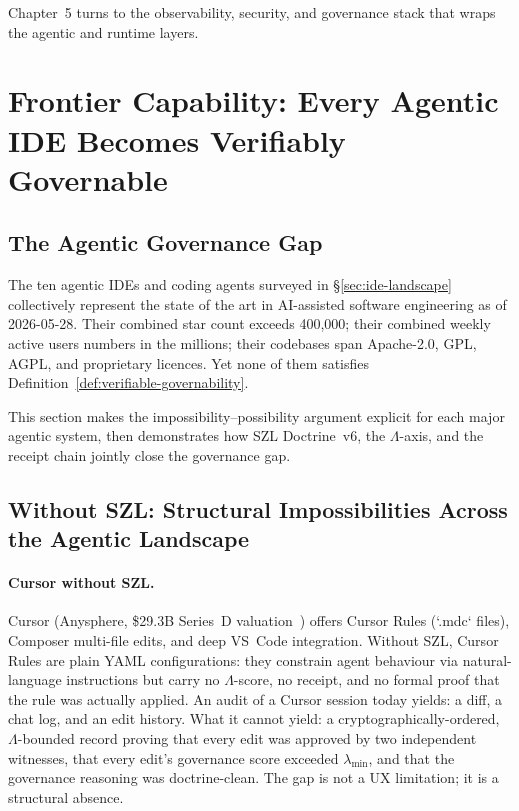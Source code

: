 Chapter~5 turns to the observability, security, and governance stack that
wraps the agentic and runtime layers.

\section{Frontier Capability: Every Agentic IDE Becomes Verifiably Governable}
\label{sec:agentic-frontier}

\subsection{The Agentic Governance Gap}
\label{ssec:agentic-governance-gap}

The ten agentic IDEs and coding agents surveyed in \S\ref{sec:ide-landscape}
collectively represent the state of the art in AI-assisted software engineering
as of 2026-05-28.  Their combined star count exceeds 400,000; their combined
weekly active users numbers in the millions; their codebases span Apache-2.0,
GPL, AGPL, and proprietary licences.  Yet none of them satisfies
Definition~\ref{def:verifiable-governability}.

This section makes the impossibility--possibility argument explicit for each
major agentic system, then demonstrates how SZL Doctrine~v6, the $\Lambda$-axis,
and the receipt chain jointly close the governance gap.

\subsection{Without SZL: Structural Impossibilities Across the Agentic Landscape}
\label{ssec:without-szl-agentic}

\paragraph{Cursor without SZL.}
Cursor (Anysphere, \$29.3B Series~D valuation~\cite{cursor_claude_opus_deep})
offers Cursor Rules (`.mdc` files), Composer multi-file edits, and deep
VS~Code integration.  Without SZL, Cursor Rules are plain YAML configurations:
they constrain agent behaviour via natural-language instructions but carry
no $\Lambda$-score, no receipt, and no formal proof that the rule was actually
applied.  An audit of a Cursor session today yields: a diff, a chat log, and
an edit history.  What it cannot yield: a cryptographically-ordered,
$\Lambda$-bounded record proving that every edit was approved by two independent
witnesses, that every edit's governance score exceeded $\lambda_{\min}$, and
that the governance reasoning was doctrine-clean.  The gap is not a UX
limitation; it is a structural absence.

